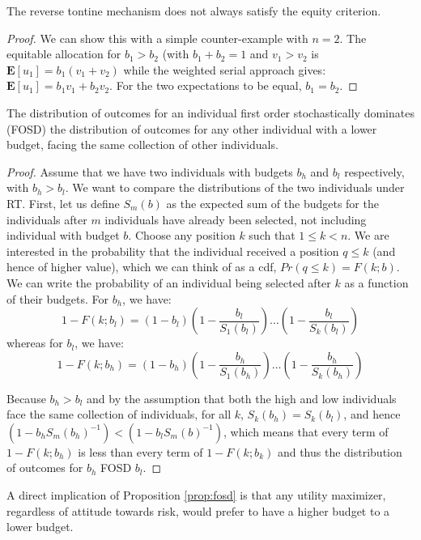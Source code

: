 \begin{proposition} 
  The reverse tontine mechanism does not always satisfy the equity
  criterion.
\end{proposition} 
\begin{proof}
We can show this with a simple counter-example with $n=2$. The
equitable allocation for $b_1 > b_2$ (with $b_1 + b_2 = 1$ and $v_1 >
v_2$ is $\mathbf{E}[u_1] = b_1 \left(v_1 + v_2\right)$ while the
weighted serial approach gives: $\mathbf{E}[u_1] = b_1 v_1 + b_2
v_2$. For the two expectations to be equal, $b_1 = b_2$.
\end{proof} 

\begin{proposition} \label{prop:fosd}
The distribution of outcomes for an individual first order
stochastically dominates (FOSD) the distribution of outcomes for any
other individual with a lower budget, facing the same collection of
other individuals.
\end{proposition}
\begin{proof}
  Assume that we have two individuals with budgets $b_h$ and $b_l$
  respectively, with $b_h > b_l$. We want to compare the
  distributions of the two individuals under RT. First, let us define
  $S_m(b)$ as the expected sum of the budgets for the individuals
  after $m$ individuals have already been selected, not including
  individual with budget $b$. Choose any position $k$ such that $1 \le
  k < n$.  We are interested in the probability that the individual
  received a position $q \le k$ (and hence of higher value), which we
  can think of as a cdf, $Pr(q \le k) = F(k; b)$. We can write the
  probability of an individual being selected after $k$ as a function
  of their budgets. For $b_h$, we have: 
  \begin{equation*}
    1 - F(k; b_l) = \left(1-b_l\right)\left(1-\frac{b_l}{S_1(b_l)}\right)
    \ldots \left(1 - \frac{b_l}{S_k(b_l)} \right) 
    \end{equation*} 
whereas for $b_l$, we have: 
     \begin{equation*}
    1 - F(k; b_h) = \left(1-b_h\right)\left(1-\frac{b_h}{S_1(b_h)}\right)
    \ldots \left(1 - \frac{b_h}{S_k(b_h)} \right) 
    \end{equation*} 
     
Because $b_h > b_l$ and by the assumption that both the high and low
individuals face the same collection of individuals, for all $k$,
$S_k(b_h) = S_k(b_l)$, and hence $(1-b_h S_m(b_h)^{-1}) < (1-b_l
S_m(b)^{-1})$, which means that every term of $1-F(k; b_h)$ is less
than every term of $1-F(k; b_k)$ and thus the distribution of outcomes
for $b_h$ FOSD $b_l$.
\end{proof} 

A direct implication of Proposition \ref{prop:fosd} is that any
utility maximizer, regardless of attitude towards risk, would prefer
to have a higher budget to a lower budget.

